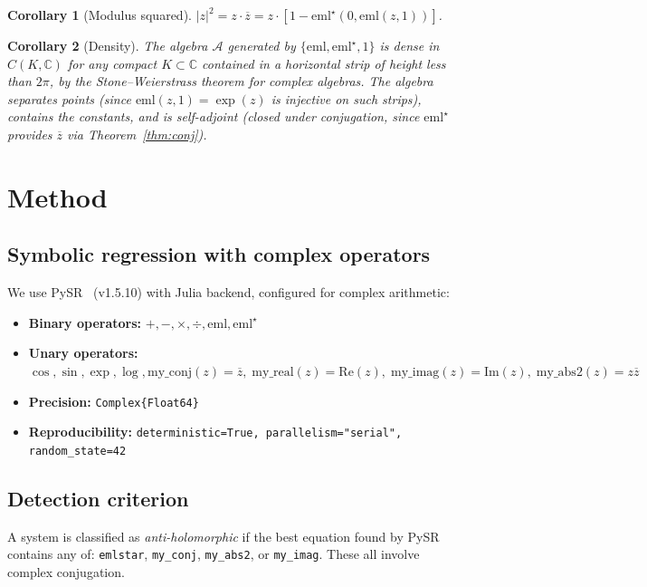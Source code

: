\documentclass[12pt,a4paper]{article}
\newtheorem{corollary}{Corollary}
\newcommand{\emlstar}{\mathrm{eml}^{\star}}
\newcommand{\eml}{\mathrm{eml}}
\newcommand{\conj}[1]{\overline{#1}}
\begin{document}
\begin{corollary}[Modulus squared]
$|z|^2 = z \cdot \conj{z} = z \cdot [1 - \emlstar(0, \eml(z,1))]$.
\end{corollary}

\begin{corollary}[Density]
\label{cor:density}
The algebra $\mathcal{A}$ generated by $\{\eml, \emlstar, 1\}$ is dense in
$C(K, \mathbb{C})$ for any compact $K \subset \mathbb{C}$ contained
in a horizontal strip of height less than $2\pi$,
by the Stone--Weierstrass theorem for complex algebras.
The algebra separates points (since $\eml(z,1) = \exp(z)$ is injective
on such strips), contains the constants, and is self-adjoint
(closed under conjugation, since $\emlstar$ provides $\conj{z}$
via Theorem~\ref{thm:conj}).
\end{corollary}


\section{Method}
\label{sec:method}

\subsection{Symbolic regression with complex operators}

We use PySR~\citep{cranmer2023pysr} (v1.5.10) with Julia
backend, configured for complex arithmetic:

\begin{itemize}
\item \textbf{Binary operators:} $+, -, \times, \div, \eml, \emlstar$
\item \textbf{Unary operators:} $\cos, \sin, \exp, \log,
  \mathrm{my\_conj}(z) = \conj{z},\;
  \mathrm{my\_real}(z) = \mathrm{Re}(z),\;
  \mathrm{my\_imag}(z) = \mathrm{Im}(z),\;
  \mathrm{my\_abs2}(z) = z\conj{z}$
\item \textbf{Precision:} \texttt{Complex\{Float64\}}
\item \textbf{Reproducibility:} \texttt{deterministic=True,
  parallelism="serial", random\_state=42}
\end{itemize}

\subsection{Detection criterion}

A system is classified as \emph{anti-holomorphic} if the best
equation found by PySR contains any of: \texttt{emlstar},
\texttt{my\_conj}, \texttt{my\_abs2}, or \texttt{my\_imag}.
These all involve complex conjugation.
\end{document}
